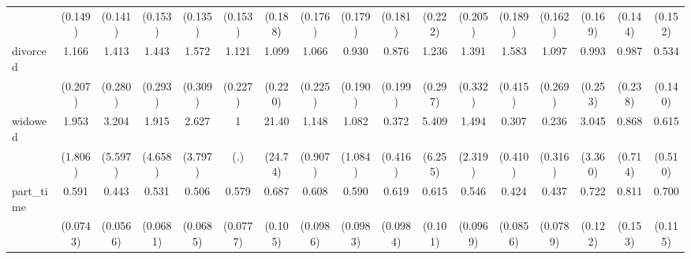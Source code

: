 {\begin{tabular}{l*{16}{c}}
                    &     (0.149)         &     (0.141)         &     (0.153)         &     (0.135)         &     (0.153)         &     (0.188)         &     (0.176)         &     (0.179)         &     (0.181)         &     (0.222)         &     (0.205)         &     (0.189)         &     (0.162)         &     (0.169)         &     (0.144)         &     (0.152)         \\
[1em]
divorced            &       1.166         &       1.413         &       1.443         &       1.572\sym{*}  &       1.121         &       1.099         &       1.066         &       0.930         &       0.876         &       1.236         &       1.391         &       1.583         &       1.097         &       0.993         &       0.987         &       0.534\sym{*}  \\
                    &     (0.207)         &     (0.280)         &     (0.293)         &     (0.309)         &     (0.227)         &     (0.220)         &     (0.225)         &     (0.190)         &     (0.199)         &     (0.297)         &     (0.332)         &     (0.415)         &     (0.269)         &     (0.253)         &     (0.238)         &     (0.140)         \\
[1em]
widowed             &       1.953         &       3.204         &       1.915         &       2.627         &           1         &       21.40\sym{**} &       1.148         &       1.082         &       0.372         &       5.409         &       1.494         &       0.307         &       0.236         &       3.045         &       0.868         &       0.615         \\
                    &     (1.806)         &     (5.597)         &     (4.658)         &     (3.797)         &         (.)         &     (24.74)         &     (0.907)         &     (1.084)         &     (0.416)         &     (6.255)         &     (2.319)         &     (0.410)         &     (0.316)         &     (3.360)         &     (0.714)         &     (0.510)         \\
[1em]
part\_time           &       0.591\sym{***}&       0.443\sym{***}&       0.531\sym{***}&       0.506\sym{***}&       0.579\sym{***}&       0.687\sym{*}  &       0.608\sym{**} &       0.590\sym{**} &       0.619\sym{**} &       0.615\sym{**} &       0.546\sym{***}&       0.424\sym{***}&       0.437\sym{***}&       0.722         &       0.811         &       0.700\sym{*}  \\
                    &    (0.0743)         &    (0.0566)         &    (0.0681)         &    (0.0685)         &    (0.0777)         &     (0.105)         &    (0.0986)         &    (0.0983)         &    (0.0984)         &     (0.101)         &    (0.0969)         &    (0.0856)         &    (0.0789)         &     (0.122)         &     (0.153)         &     (0.115)         \\

\end{tabular}}
